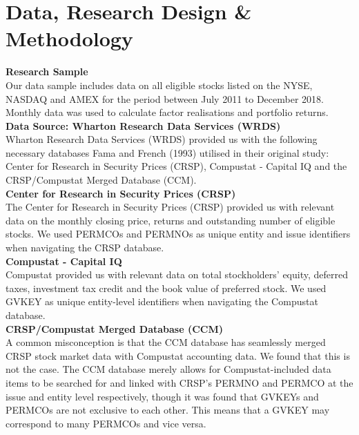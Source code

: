\documentclass[12pt]{article}
\begin{document}
\newpage
		
\section{Data, Research Design \& Methodology}
\noindent \textbf{Research Sample}\\
\noindent Our data sample includes data on all eligible stocks listed on the NYSE, NASDAQ and AMEX for the period between July 2011 to December 2018. Monthly data was used to calculate factor realisations and portfolio returns.\\

\noindent \textbf{Data Source: Wharton Research Data Services (WRDS)}\\
Wharton Research Data Services (WRDS) provided us with the following necessary databases Fama and French (1993) utilised in their original study: Center for Research in Security Prices (CRSP), Compustat - Capital IQ and the CRSP/Compustat Merged Database (CCM). \\

\noindent \textbf{Center for Research in Security Prices (CRSP)}\\
\noindent The Center for Research in Security Prices (CRSP) provided us with relevant data on the monthly closing price, returns and outstanding number of eligible stocks. We used PERMCOs and PERMNOs as unique entity and issue identifiers when navigating the CRSP database.\\

\noindent \textbf{Compustat - Capital IQ}\\
\noindent Compustat provided us with relevant data on total stockholders' equity, deferred taxes, investment tax credit and the book value of preferred stock. We used GVKEY as unique entity-level identifiers when navigating the Compustat database.\\

\noindent \textbf{CRSP/Compustat Merged Database (CCM)}\\
\noindent A common misconception is that the CCM database has seamlessly merged CRSP stock market data with Compustat accounting data. We found that this is not the case. The CCM database merely allows for Compustat-included data items to be searched for and linked with CRSP's PERMNO and PERMCO at the issue and entity level respectively, though it was found that GVKEYs and PERMCOs are not exclusive to each other. This means that a GVKEY may correspond to many PERMCOs and vice versa. \\
\end{document}
